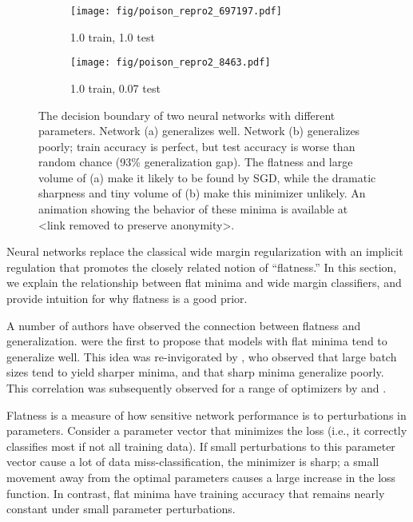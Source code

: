 \documentclass{article}
\begin{document}
    \begin{figure}[b!]
        \centering
        \begin{subfigure}{.49\textwidth}
            \centering
            \texttt{[image: fig/poison\_repro2\_697197.pdf]}
            \caption{\small 1.0 train, 1.0 test}
            \label{fig:swissrollclean}
        \end{subfigure}
        \begin{subfigure}{.49\textwidth}
            \centering
            \texttt{[image: fig/poison\_repro2\_8463.pdf]}
            \caption{\small 1.0 train, 0.07 test}
            \label{fig:swissrollpoison}
        \end{subfigure}
        \caption{\small %
          The decision boundary of two neural networks with different parameters. Network (a) generalizes well. Network (b) generalizes poorly; train accuracy is perfect, but test accuracy is worse than random chance (93\% generalization gap).  The flatness and large volume of (a) make it likely to be found by SGD, while the dramatic sharpness and tiny volume of (b) make this minimizer unlikely.  An animation showing the behavior of these minima is available at <link removed to preserve anonymity>.
       }
        \label{fig:swissroll}
    \end{figure}

Neural networks replace the classical wide margin regularization with an implicit regulation that promotes the closely related notion of ``flatness.'' In this section, we explain the relationship between flat minima and wide margin classifiers, and provide intuition for why flatness is a good prior.

A number of authors have observed the connection between flatness and generalization.  \cite{hoch1997flat} were the first to propose that models with flat minima tend to generalize well.
    This idea was re-invigorated by \cite{keskar2016largebatch}, who observed that large batch sizes tend to yield sharper minima, and that sharp minima generalize poorly.   This correlation was subsequently observed for a range of optimizers by \cite{izmailov2018swa} and \cite{wang2018identifying}.

    Flatness is a measure of how sensitive network performance is to perturbations in parameters.  Consider a parameter vector that minimizes the loss (i.e., it correctly classifies most if not all training data). If small perturbations to this parameter vector cause a lot of data miss-classification, the minimizer is sharp;  a small movement away from the optimal parameters causes a large increase in the loss function.  In contrast, flat minima have training accuracy that remains nearly constant under small parameter perturbations.
\end{document}
